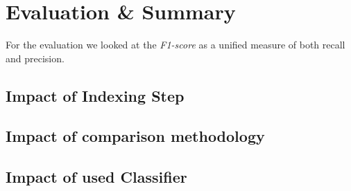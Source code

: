 \documentclass[sigconf,nonacm]{acmart}
\begin{document}
\section{Evaluation \& Summary}

For the evaluation we looked at the \emph{F1-score} as a unified
measure of both recall and precision.

\subsection{Impact of Indexing Step}



\subsection{Impact of comparison methodology}

\subsection{Impact of used Classifier}




\end{document}
